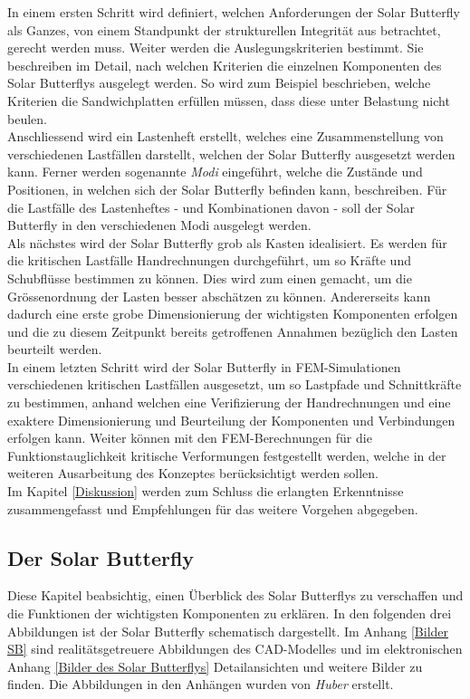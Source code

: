 In einem ersten Schritt wird definiert, welchen Anforderungen der Solar Butterfly als Ganzes, von einem Standpunkt der strukturellen Integrität aus betrachtet, gerecht werden muss. Weiter werden die Auslegungskriterien bestimmt. Sie beschreiben im Detail, nach welchen Kriterien die einzelnen Komponenten des Solar Butterflys ausgelegt werden. So wird zum Beispiel beschrieben, welche Kriterien die Sandwichplatten erfüllen müssen, dass diese unter Belastung nicht beulen.\\
Anschliessend wird ein Lastenheft erstellt, welches eine Zusammenstellung von verschiedenen Lastfällen darstellt, welchen der Solar Butterfly ausgesetzt werden kann. Ferner werden sogenannte \emph{Modi} eingeführt, welche die Zustände und Positionen, in welchen sich der Solar Butterfly befinden kann, beschreiben. Für die Lastfälle des Lastenheftes - und Kombinationen davon - soll der Solar Butterfly in den verschiedenen Modi ausgelegt werden.\\
Als nächstes wird der Solar Butterfly grob als \glqq Kasten\grqq{} idealisiert. Es werden für die kritischen Lastfälle Handrechnungen durchgeführt, um so Kräfte und Schubflüsse bestimmen zu können. Dies wird zum einen gemacht, um die Grössenordnung der Lasten besser abschätzen zu können. Andererseits kann dadurch eine erste grobe Dimensionierung der wichtigsten Komponenten erfolgen und die zu diesem Zeitpunkt bereits getroffenen Annahmen bezüglich den Lasten beurteilt werden.\\
In einem letzten Schritt wird der Solar Butterfly in FEM-Simulationen verschiedenen kritischen Lastfällen ausgesetzt, um so Lastpfade und Schnittkräfte zu bestimmen, anhand welchen eine Verifizierung der Handrechnungen und eine exaktere Dimensionierung und Beurteilung der Komponenten und Verbindungen erfolgen kann. Weiter können mit den FEM-Berechnungen für die Funktionstauglichkeit kritische Verformungen festgestellt werden, welche in der weiteren Ausarbeitung des Konzeptes berücksichtigt werden sollen.\\
Im Kapitel \ref{Diskussion} werden zum Schluss die erlangten Erkenntnisse zusammengefasst und Empfehlungen für das weitere Vorgehen abgegeben.

\subsection{Der Solar Butterfly}
Diese Kapitel beabsichtig, einen Überblick des Solar Butterflys zu verschaffen und die Funktionen der wichtigsten Komponenten zu erklären.
In den folgenden drei Abbildungen ist der Solar Butterfly schematisch dargestellt. Im Anhang \ref{Bilder SB} sind realitätsgetreuere Abbildungen des CAD-Modelles und im elektronischen Anhang \ref{Bilder des Solar Butterflys} Detailansichten und weitere Bilder zu finden. Die Abbildungen in den Anhängen wurden von \emph{Huber} erstellt.

